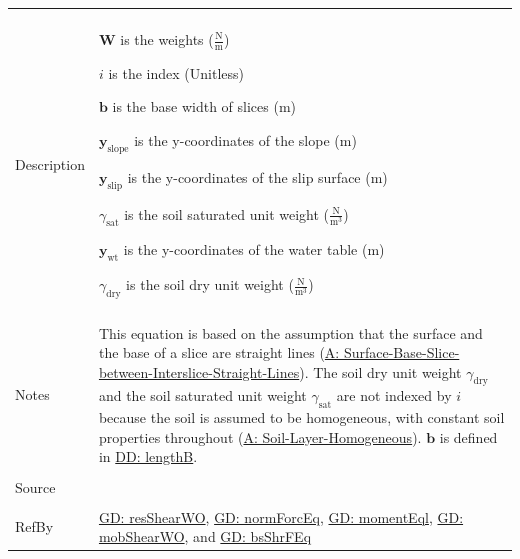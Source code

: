 \documentclass[12pt]{article}
\begin{document}
\begin{minipage}{\textwidth}
\begin{tabular}{>{\raggedright}p{}>{\raggedright\arraybackslash}p{}}
\\ \midrule \\
Description & \begin{symbDescription}
              \item{$\mathbf{W}$ is the weights ($\frac{\text{N}}{\text{m}}$)}
              \item{$i$ is the index (Unitless)}
              \item{$\mathbf{b}$ is the base width of slices (m)}
              \item{${\mathbf{y}_{\text{slope}}}$ is the y-coordinates of the slope (m)}
              \item{${\mathbf{y}_{\text{slip}}}$ is the y-coordinates of the slip surface (m)}
              \item{${γ_{\text{sat}}}$ is the soil saturated unit weight ($\frac{\text{N}}{\text{m}^{3}}$)}
              \item{${\mathbf{y}_{\text{wt}}}$ is the y-coordinates of the water table (m)}
              \item{${γ_{\text{dry}}}$ is the soil dry unit weight ($\frac{\text{N}}{\text{m}^{3}}$)}
              \end{symbDescription}
\\ \midrule \\
Notes & This equation is based on the assumption that the surface and the base of a slice are straight lines (\hyperref[assumpSBSBISL]{A: Surface-Base-Slice-between-Interslice-Straight-Lines}). The soil dry unit weight ${γ_{\text{dry}}}$ and the soil saturated unit weight ${γ_{\text{sat}}}$ are not indexed by $i$ because the soil is assumed to be homogeneous, with constant soil properties throughout (\hyperref[assumpSLH]{A: Soil-Layer-Homogeneous}). $\mathbf{b}$ is defined in \hyperref[DD:lengthB]{DD: lengthB}.
        
\\ \midrule \\
Source & \cite{fredlund1977}
         
\\ \midrule \\
RefBy & \hyperref[GD:resShearWO]{GD: resShearWO}, \hyperref[GD:normForcEq]{GD: normForcEq}, \hyperref[GD:momentEql]{GD: momentEql}, \hyperref[GD:mobShearWO]{GD: mobShearWO}, and \hyperref[GD:bsShrFEq]{GD: bsShrFEq}
        
\\ \bottomrule
\end{tabular}
\end{minipage}
\end{document}
